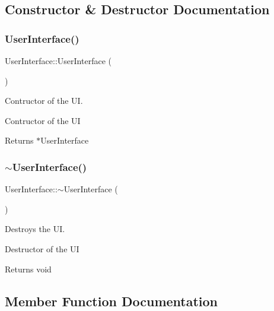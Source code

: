 \subsection{Constructor \& Destructor Documentation}
\mbox{\label{class_user_interface_ae6fb70370701b3bd6120e923df9705b0}} 
\subsubsection{\texorpdfstring{User\+Interface()}{UserInterface()}}
{\footnotesize\ttfamily User\+Interface\+::\+User\+Interface (\begin{DoxyParamCaption}{ }\end{DoxyParamCaption})}



Contructor of the UI. 

Contructor of the UI

\begin{DoxyReturn}{Returns}
$\ast$\+User\+Interface 
\end{DoxyReturn}
\mbox{\label{class_user_interface_ae588b2ff1711a016dd4c6fc5002c0841}} 
\subsubsection{\texorpdfstring{$\sim$\+User\+Interface()}{~UserInterface()}}
{\footnotesize\ttfamily User\+Interface\+::$\sim$\+User\+Interface (\begin{DoxyParamCaption}{ }\end{DoxyParamCaption})}



Destroys the UI. 

Destructor of the UI

\begin{DoxyReturn}{Returns}
void 
\end{DoxyReturn}


\subsection{Member Function Documentation}
\mbox{\label{class_user_interface_a464f85830f41de3b226a722bb436b22d}} 
